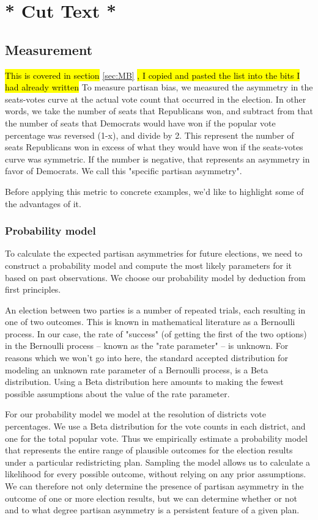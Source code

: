 \documentclass[preprint,12pt]{article}
\newcommand{\CM}[2][green]{ {\sethlcolor{#1} \hl{#2}} }
\begin{document}
\section{* Cut Text *}


\subsection{Measurement}
\CM{This is covered in section }\ref{sec:MB}\CM{, I copied and pasted the list into the bits I had already written}
To measure partisan bias, we measured the asymmetry in the seats-votes curve at the actual vote count that occurred in the election.  
In other words, we take the number of seats that Republicans won, and subtract from that the number of seats that Democrats would have won if the popular vote percentage was reversed (1-x), and divide by 2.  
This represent the number of seats Republicans won in excess of what they would have won if the seats-votes curve was symmetric.  
If the number is negative, that represents an asymmetry in favor of Democrats.
We call this "specific partisan asymmetry".

Before applying this metric to concrete examples, we'd like to highlight some of the advantages of it.



\subsubsection{Probability model}

To calculate the expected partisan asymmetries for future elections, we need to construct a probability model and compute the most likely parameters for it based on past observations.
We choose our probability model by deduction from first principles.

An election between two parties is a number of repeated trials, each resulting in one of two outcomes.  This is known in mathematical literature as a Bernoulli process.
In our case, the rate of "success" (of getting the first of the two options) in the Bernoulli process -- known as the "rate parameter" -- is unknown.
For reasons which we won't go into here, the standard accepted distribution for modeling an unknown rate parameter of a Bernoulli process, is a Beta distribution.
Using a Beta distribution here amounts to making the fewest possible assumptions about the value of the rate parameter.

For our probability model we model at the resolution of districts vote percentages.
We use a Beta distribution for the vote counts in each district, and one for the total popular vote.
Thus we empirically estimate a probability model that represents the entire range of plausible outcomes for the election results under a particular redistricting plan.
Sampling the model allows us to calculate a likelihood for every possible outcome, without relying on any prior assumptions.
We can therefore not only determine the presence of partisan asymmetry in the outcome of one or more election results, but we can determine whether or not and to what degree partisan asymmetry is a persistent feature of a given plan.
\end{document}
